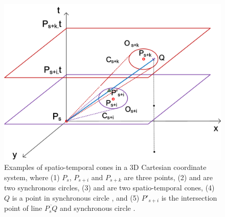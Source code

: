 \begin{figure}[tb!]
	\centering
	\includegraphics[scale=0.66]{figures/Fig-CIS.png}
	\caption{\small Examples of spatio-temporal cones in a 3D Cartesian coordinate system, where (1) $P_s$, $P_{s+i}$ and $P_{s+k}$ are three points, (2)  and  are two synchronous circles, (3)  and  are two spatio-temporal cones, (4) $Q$ is a point in synchronous circle , and (5) $P'_{s+i}$ is the intersection point of line $\overline{P_sQ}$ and synchronous circle .}
	\label{fig:cis}
\end{figure}







